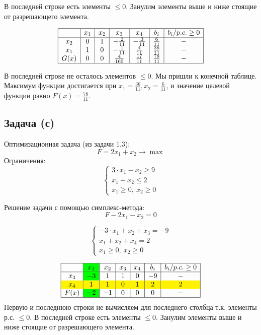 \documentclass{article}
\begin{document}
В последней строке есть элементы \(\leq 0\). Занулим элементы выше и ниже стоящие от разрешающего элемента.

\[
    \begin{array}{|c|c|c|c|c|c|c|}
        \hline
             & x_1 & x_2 & x_3           & x_4           & b_i           & b_i/p.c. \geq 0 \\
        \hline
        x_2  & 0   & 1   & -\frac{2}{11} & -\frac{3}{11} & \frac{6}{11}  & -               \\
        x_1  & 1   & 0   & -\frac{1}{11} & \frac{4}{11}  & \frac{36}{11} & -               \\
        G(x) & 0   & 0   & \frac{4}{165} & \frac{17}{11} & \frac{78}{11} & -               \\
        \hline
    \end{array}
\]

В последней строке не осталось элементов \(\leq 0\). Мы пришли к конечной таблице.\\
Максимум функции достигается при \(x_1 = \frac{36}{11}, x_2 = \frac{6}{11}\), и значение целевой функции равно \(F(x) = \frac{78}{11}\).

\newpage

\subsection{Задача (с)}

Оптимизационная задача (из задачи 1.3):
\[
    F = 2x_1 + x_2 \to \max
\]
Ограничения:
\[
    \begin{cases}
        3 \cdot x_1 - x_2 \geq 9 \\
        x_1 + x_2 \leq 2         \\
        x_1 \geq 0, \ x_2 \geq 0
    \end{cases}
\]

Решение задачи с помощью симплекс-метода:
\[
    F - 2x_1 - x_2 = 0
\]

\[
    \begin{cases}
        -3 \cdot x_1 + x_2 + x_3 =  -9 \\
        x_1 + x_2 + x_4 = 2            \\
        x_1 \geq 0, \ x_2 \geq 0
    \end{cases}
\]

\vspace{25pt}

\[
    \begin{array}{|c|>{\columncolor{green}}c|c|c|c|c|c|}
        \hline
             & x_1 & x_2 & x_3 & x_4 & b_i & b_i/p.c. \geq 0 \\
        \hline
        x_3  & -3  & 1   & 1   & 0   & -9  & -               \\
        \rowcolor{yellow}
        x_4  & 1   & 1   & 0   & 1   & 2   & 2               \\
        F(x) & -2  & -1  & 0   & 0   & 0   & -               \\
        \hline
    \end{array}
\]
Первую и последнюю строки не вычисляем для последнего столбца т.к. элементы р.с. \(\leq 0\).
В последней строке есть элементы \(\leq 0\). Занулим элементы выше и ниже стоящие от разрешающего элемента.
\end{document}

